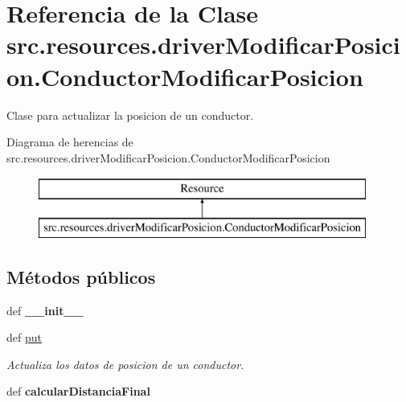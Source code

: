 \hypertarget{classsrc_1_1resources_1_1driver_modificar_posicion_1_1_conductor_modificar_posicion}{\section{Referencia de la Clase src.\-resources.\-driver\-Modificar\-Posicion.\-Conductor\-Modificar\-Posicion}
\label{classsrc_1_1resources_1_1driver_modificar_posicion_1_1_conductor_modificar_posicion}
}


Clase para actualizar la posicion de un conductor.  


Diagrama de herencias de src.\-resources.\-driver\-Modificar\-Posicion.\-Conductor\-Modificar\-Posicion\begin{figure}[H]
\begin{center}
\leavevmode
\includegraphics[height=2.000000cm]{classsrc_1_1resources_1_1driver_modificar_posicion_1_1_conductor_modificar_posicion}
\end{center}
\end{figure}
\subsection*{Métodos públicos}
\begin{DoxyCompactItemize}
\item 
\hypertarget{classsrc_1_1resources_1_1driver_modificar_posicion_1_1_conductor_modificar_posicion_a54c8ffdffc9d1a7057ec8fea60b6c92f}{def {\bfseries \-\_\-\-\_\-init\-\_\-\-\_\-}}\label{classsrc_1_1resources_1_1driver_modificar_posicion_1_1_conductor_modificar_posicion_a54c8ffdffc9d1a7057ec8fea60b6c92f}

\item 
def \hyperlink{classsrc_1_1resources_1_1driver_modificar_posicion_1_1_conductor_modificar_posicion_a93cfdaaee4b2f167fff1a96f5b2924d7}{put}
\begin{DoxyCompactList}\small\item\em Actualiza los datos de posicion de un conductor. \end{DoxyCompactList}\item 
\hypertarget{classsrc_1_1resources_1_1driver_modificar_posicion_1_1_conductor_modificar_posicion_aa613a4405c2d8537480f67d420080375}{def {\bfseries calcular\-Distancia\-Final}}\label{classsrc_1_1resources_1_1driver_modificar_posicion_1_1_conductor_modificar_posicion_aa613a4405c2d8537480f67d420080375}

\end{DoxyCompactItemize}
